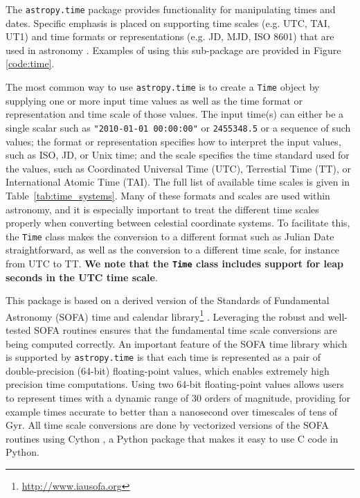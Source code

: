 \documentclass[traditabstract]{aa}
\begin{document}
\label{sec:time}


The \texttt{astropy.time} package provides functionality for manipulating times
and dates. Specific emphasis is placed on supporting time scales (e.g. UTC,
TAI, UT1) and time formats or representations (e.g. JD, MJD, ISO 8601) that are
used in astronomy \citep{guinot88,kovalevsky01,sofa_wallace}. Examples of using this sub-package are provided in Figure
\ref{code:time}.

The most common way to use \texttt{astropy.time} is to create a \texttt{Time}
object by supplying one or more input time values as well as the time
format or representation and time scale of those values. The input time(s) can
either be a single scalar such as \verb|"2010-01-01 00:00:00"| or \verb|2455348.5|
or a sequence of such values; the format or representation specifies how to
interpret the input values, such as ISO, JD, or Unix time; and the scale
specifies the time standard used for the values, such as Coordinated Universal
Time (UTC), Terrestial Time (TT), or International Atomic Time (TAI). The full
list of available time scales is given in Table~\ref{tab:time_systems}. Many
of these formats and scales are used within astronomy, and it is especially
important to treat the different time scales properly when converting between
celestial coordinate systems. To facilitate this, the \texttt{Time} class makes
the conversion to a different format such as Julian Date straightforward, as
well as the conversion to a different time scale, for instance from UTC to TT.
\textbf{We note that the \texttt{Time} class includes support for leap seconds
in the UTC time scale}.

This package is based on a derived version of the Standards of Fundamental
Astronomy (SOFA) time and calendar
library\footnote{\url{http://www.iausofa.org}} \citep{sofa_wallace}.
Leveraging the robust and well-tested SOFA routines ensures that the
fundamental time scale conversions are being computed correctly. An important
feature of the SOFA time library which is supported by \texttt{astropy.time} is
that each time is represented as a pair of double-precision (64-bit)
floating-point values, which enables extremely high precision time
computations. Using two 64-bit floating-point values allows users to represent
times with a dynamic range of 30 orders of magnitude, providing for example times
accurate to better than a nanosecond over timescales of tens of Gyr. All time
scale conversions are done by vectorized versions of the SOFA routines using
Cython \citep{cython}, a Python package
that makes it easy to use C code in Python.
\end{document}

